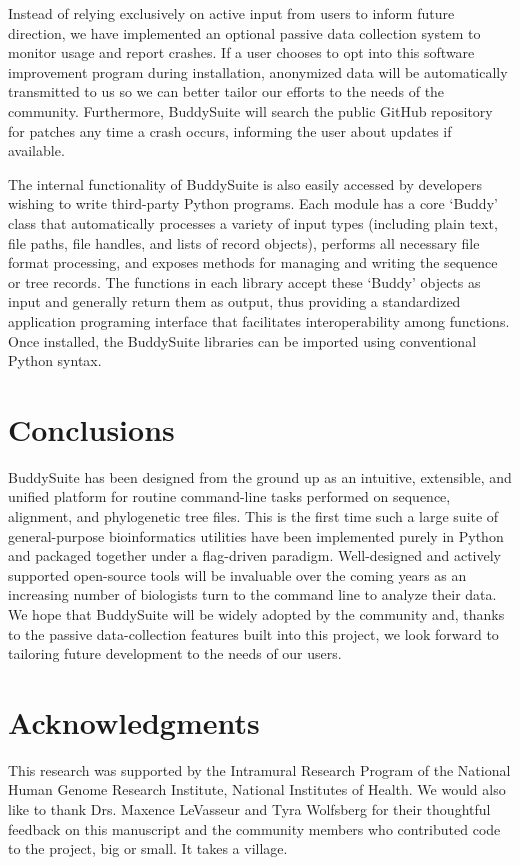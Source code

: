 \documentclass[nogrid]{MBE_article}%
\begin{document}
Instead of relying exclusively on active input from users to inform future direction, we have implemented an optional passive data collection system to monitor usage and report crashes. If a user chooses to opt into this software improvement program during installation, anonymized data will be automatically transmitted to us so we can better tailor our efforts to the needs of the community. Furthermore, BuddySuite will search the public GitHub repository for patches any time a crash occurs, informing the user about updates if available.

The internal functionality of BuddySuite is also easily accessed by developers wishing to write third-party Python programs. Each module has a core `Buddy' class that automatically processes a variety of input types (including plain text, file paths, file handles, and lists of record objects), performs all necessary file format processing, and exposes methods for managing and writing the sequence or tree records. The functions in each library accept these `Buddy' objects as input and generally return them as output, thus providing a standardized application programing interface that facilitates interoperability among functions. Once installed, the BuddySuite libraries can be imported using conventional Python syntax.

\section{Conclusions}
BuddySuite has been designed from the ground up as an intuitive, extensible, and unified platform for routine command-line tasks performed on sequence, alignment, and phylogenetic tree files. This is the first time such a large suite of general-purpose bioinformatics utilities have been implemented purely in Python and packaged together under a flag-driven paradigm. Well-designed and actively supported open-source tools will be invaluable over the coming years as an increasing number of biologists turn to the command line to analyze their data. We hope that BuddySuite will be widely adopted by the community and, thanks to the passive data-collection features built into this project, we look forward to tailoring future development to the needs of our users.


\section{Acknowledgments}
This research was supported by the Intramural Research Program of the National Human Genome Research Institute, National Institutes of Health. We would also like to thank Drs. Maxence LeVasseur and Tyra Wolfsberg for their thoughtful feedback on this manuscript and the community members who contributed code to the project, big or small. It takes a village.
\end{document}

